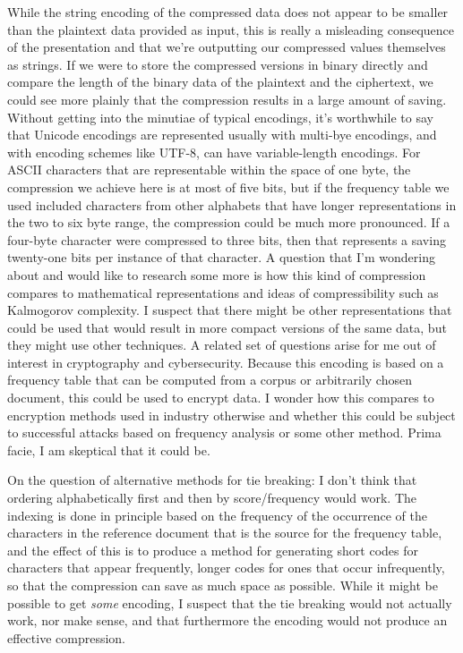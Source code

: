 \documentclass[10pt,letterpaper,final]{report}
\begin{document}
While the string encoding of the compressed data does not appear to be smaller than the plaintext data provided as input, this is really a misleading consequence of the presentation and that we're outputting our compressed values themselves as strings. If we were to store the compressed versions in binary directly and compare the length of the binary data of the plaintext and the ciphertext, we could see more plainly that the compression results in a large amount of saving. Without getting into the minutiae of typical encodings, it's worthwhile to say that Unicode encodings are represented usually with multi-bye encodings, and with encoding schemes like UTF-8, can have variable-length encodings. \cite{JoelonSoftware2003AbsoluteMinimumEvery} For ASCII characters that are representable within the space of one byte, the compression we achieve here is at most of five bits, but if the frequency table we used included characters from other alphabets that have longer representations in the two to six byte range, the compression could be much more pronounced. If a four-byte character were compressed to three bits, then that represents a saving twenty-one bits per instance of that character. A question that I'm wondering about and would like to research some more is how this kind of compression compares to mathematical representations and ideas of compressibility such as Kalmogorov complexity. I suspect that there might be other representations that could be used that would result in more compact versions of the same data, but they might use other techniques. A related set of questions arise for me out of interest in cryptography and cybersecurity. Because this encoding is based on a frequency table that can be computed from a corpus or arbitrarily chosen document, this could be used to encrypt data. I wonder how this compares to encryption methods used in industry otherwise and whether this could be subject to successful attacks based on frequency analysis or some other method. Prima facie, I am skeptical that it could be.

On the question of alternative methods for tie breaking: I don't think that ordering alphabetically first and then by score/frequency would work. The indexing is done in principle based on the frequency of the occurrence of the characters in the reference document that is the source for the frequency table, and the effect of this is to produce a method for generating short codes for characters that appear frequently, longer codes for ones that occur infrequently, so that the compression can save as much space as possible. While it might be possible to get \emph{some} encoding, I suspect that the tie breaking would not actually work, nor make sense, and that furthermore the encoding would not produce an effective compression.
\end{document}
